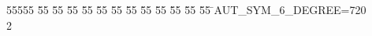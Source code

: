%
%
\begin{tabbing}
55555 \= 55 \= 55 \= 55 \= 55 \= 55 \= 55 \= 55 \= 55 \= 55 \= 55 \= 55 \= 55 \= \>AUT\_SYM\_6\_DEGREE=720\\[0pt]
2\>\end{tabbing}

